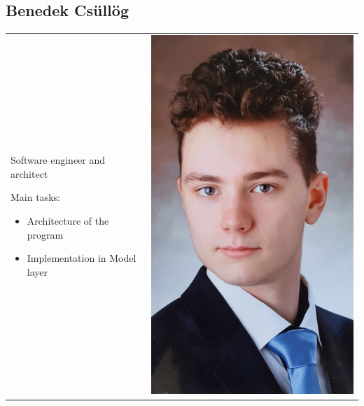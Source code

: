 \documentclass{article}
\begin{document}
\subsection{Benedek Csüllög}
    \begin{tabular}{@{}p{}@{} p{}@{}}
    Software engineer and architect
    
    Main tasks:
    \begin{itemize}
        \item Architecture of the program
        \item Implementation in Model layer
    \end{itemize}
    &
    \includegraphics[width=\linewidth]{img/Benedek_Csullog.jpg}
    \end{tabular}
\end{document}
